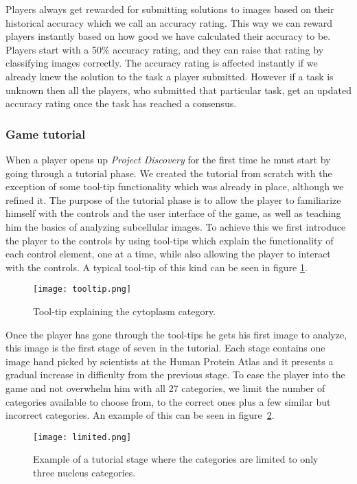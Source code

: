 Players always get rewarded for submitting solutions to images based on their historical accuracy which we call an accuracy rating. This way we can reward players instantly based on how good we have calculated their accuracy to be. Players start with a 50\% accuracy rating, and they can raise that rating by classifying images correctly. The accuracy rating is affected instantly if we already knew the solution to the task a player submitted. However if a task is unknown then all the players, who submitted that particular task, get an updated accuracy rating once the task has reached a consensus.

\subsubsection{Game tutorial}
When a player opens up \emph{Project Discovery} for the first time he must start by going through a tutorial phase. We created the tutorial from scratch with the exception of some tool-tip functionality which was already in place, although we refined it. The purpose of the tutorial phase is to allow the player to familiarize himself with the controls and the user interface of the game, as well as teaching him the basics of analyzing subcellular images. To achieve this we first introduce the player to the controls by using tool-tips which explain the functionality of each control element, one at a time, while also allowing the player to interact with the controls. A typical tool-tip of this kind can be seen in figure \ref{fig:tooltip}.

\begin{figure}[H]
\centering
\graphicspath{ {./graphics/} }
\centerline{\texttt{[image: tooltip.png]}}
\caption{\label{fig:tooltip}Tool-tip explaining the cytoplasm category.}
\end{figure}

Once the player has gone through the tool-tips he gets his first image to analyze, this image is the first stage of seven in the tutorial. Each stage contains one image hand picked by scientists at the Human Protein Atlas and it presents a gradual increase in difficulty from the previous stage. To ease the player into the game and not overwhelm him with all 27 categories, we limit the number of categories available to choose from, to the correct ones plus a few similar but incorrect categories. An example of this can be seen in figure~\ref{fig:limited}.

\begin{figure}[H]
\centering
\graphicspath{ {./graphics/} }
\centerline{\texttt{[image: limited.png]}}
\caption{\label{fig:limited}Example of a tutorial stage where the categories are limited to only three nucleus categories.}
\end{figure}


